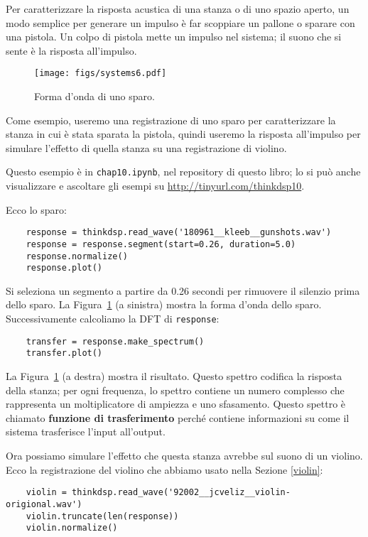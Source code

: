 \documentclass[12pt,a4paper]{book}
\begin{document}
Per caratterizzare la risposta acustica di una stanza o di uno spazio aperto, un modo semplice per generare un impulso è far scoppiare un pallone o sparare con una pistola. Un colpo di pistola mette un impulso nel sistema; il suono che si sente è la risposta all'impulso.

\begin{figure} 

\centerline{\texttt{[image: figs/systems6.pdf]}} \caption{Forma d'onda di uno sparo.} \label{fig.systems6} \end{figure} 

Come esempio, useremo una registrazione di uno sparo per caratterizzare la stanza in cui è stata sparata la pistola, quindi useremo la risposta all'impulso per simulare l'effetto di quella stanza su una registrazione di violino.

Questo esempio è in {\tt chap10.ipynb}, nel repository di questo libro; lo si può anche visualizzare e ascoltare gli esempi su \url{http://tinyurl.com/thinkdsp10}.

Ecco lo sparo:

\begin{verbatim} 
    response = thinkdsp.read_wave('180961__kleeb__gunshots.wav')
    response = response.segment(start=0.26, duration=5.0)
    response.normalize()
    response.plot()
 \end{verbatim} 

Si seleziona un segmento a partire da 0.26 secondi per rimuovere il silenzio prima dello sparo. La Figura~\ref{fig.systems6} (a sinistra) mostra la forma d'onda dello sparo. Successivamente calcoliamo la DFT di {\tt response}:

\begin{verbatim} 
    transfer = response.make_spectrum()
    transfer.plot()
 \end{verbatim} 

La Figura~\ref{fig.systems6} (a destra) mostra il risultato. Questo spettro codifica la risposta della stanza; per ogni frequenza, lo spettro contiene un numero complesso che rappresenta un moltiplicatore di ampiezza e uno sfasamento. Questo spettro è chiamato {\bf funzione di trasferimento} perché contiene informazioni su come il sistema trasferisce l'input all'output.

Ora possiamo simulare l'effetto che questa stanza avrebbe sul suono di un violino. Ecco la registrazione del violino che abbiamo usato nella Sezione \ref{violin}:

\begin{verbatim} 
    violin = thinkdsp.read_wave('92002__jcveliz__violin-origional.wav')
    violin.truncate(len(response))
    violin.normalize()
 \end{verbatim} 
\end{document}
